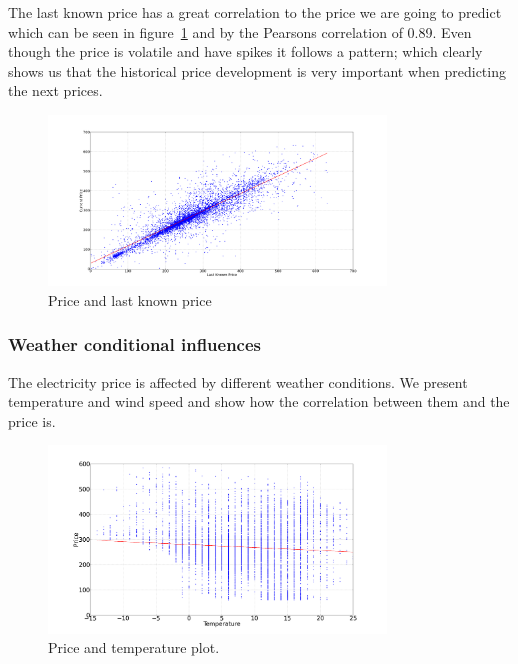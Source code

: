 The last known price has a great correlation to the price we are going to predict which can be seen in figure~\ref{fig:price_price} and by the Pearsons correlation of 0.89. Even though the price is volatile and have spikes it follows a pattern; which clearly shows us that the historical price development is very important when predicting the next prices.

\begin{figure}[H]
\centering
\includegraphics[width=0.8\textwidth]{billeder/priceVsLastKnownPrice.png}
\caption{Price and last known price}
\label{fig:price_price}
\end{figure}

\subsubsection{Weather conditional influences}
\label{sec:priceWeatherInfluence}
The electricity price is affected by different weather conditions. We present temperature and wind speed and show how the correlation between them and the price is.

\begin{figure}[H]
\centering
\includegraphics[width=0.8\textwidth]{billeder/energy_price_plots/price_temp.png}
\caption{Price and temperature plot.}
\label{fig:price_temp}
\end{figure}

